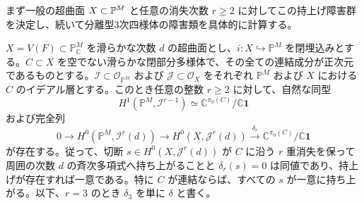 まず一般の超曲面 $X\subset\mathbb P^M$ と任意の消失次数 $r\ge2$ に対してこの持上げ障害群を決定し、続いて分離型3次四様体の障害類を具体的に計算する。

\begin{proposition}[高次消失を保つ持上げと連結成分の障害]
\label{prop:pg-triple-lifting-obstruction}
$X=V(F)\subset\mathbb P^M_{\mathbb C}$ を滑らかな次数 $d$ の超曲面とし、$i:X\hookrightarrow\mathbb P^M$ を閉埋込みとする。$C\subset X$ を空でない滑らかな閉部分多様体で、その全ての連結成分が正次元であるものとする。$\mathcal I\subset\mathcal O_{\mathbb P^M}$ および $\mathcal J\subset\mathcal O_X$ をそれぞれ $\mathbb P^M$ および $X$ における $C$ のイデアル層とする。このとき任意の整数 $r\ge2$ に対して、自然な同型
\begin{equation}\label{eq:pg-split-disconnected-cohomology}
 H^1(\mathbb P^M,\mathcal I^{r-1})
 \simeq \mathbb C^{\pi_0(C)}/\mathbb C\mathbf1
\end{equation}
および完全列
\begin{equation}\label{eq:pg-triple-lifting-sections}
 0\longrightarrow H^0(\mathbb P^M,\mathcal I^r(d))
 \longrightarrow H^0(X,\mathcal J^r(d))
 \xrightarrow{\ \delta_r\ }
 \mathbb C^{\pi_0(C)}/\mathbb C\mathbf1
\end{equation}
が存在する。従って、切断 $s\in H^0(X,\mathcal J^r(d))$ が $C$ に沿う $r$ 重消失を保って周囲の次数 $d$ の斉次多項式へ持ち上がることと $\delta_r(s)=0$ は同値であり、持上げが存在すれば一意である。特に $C$ が連結ならば、すべての $s$ が一意に持ち上がる。以下、$r=3$ のとき $\delta_3$ を単に $\delta$ と書く。
\end{proposition}

